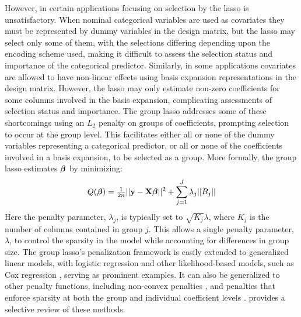 However, in certain applications focusing on selection by the lasso is unsatisfactory. When nominal categorical variables are used as covariates they must be represented by dummy variables in the design matrix, but the lasso may select only some of them, with the selections differing depending upon the encoding scheme used, making it difficult to assess the selection status and importance of the categorical predictor. Similarly, in some applications covariates are allowed to have non-linear effects using basis expansion representations in the design matrix. However, the lasso may only estimate non-zero coefficients for some columns involved in the basis expansion, complicating assessments of selection status and importance.
The group lasso \citep{Yuan2006} addresses some of these shortcomings using an $L_2$ penalty on groups of coefficients, prompting selection to occur at the group level. This facilitates either all or none of the dummy variables representing a categorical predictor, or all or none of the coefficients involved in a basis expansion, to be selected as a group. More formally, the group lasso estimates $\boldsymbol{\beta}$ by minimizing:
\begin{equation*}
Q(\boldsymbol{\beta}) = \tfrac{1}{2n}||\mathbf{y} - \mathbf{X}\boldsymbol{\beta}||^2 + \sum_{j = 1}^{J}\lambda_j ||B_j||
\end{equation*}
Here the penalty parameter, $\lambda_j$, is typically set to $\sqrt{K_j}\lambda$, where $K_j$ is the number of columns contained in group $j$. This allows a single penalty parameter, $\lambda$, to control the sparsity in the model while accounting for differences in group size. 
The group lasso’s penalization framework is easily extended to generalized linear models, with logistic regression \citep{meier2008} and other likelihood-based models, such as Cox regression \citep{Wang2009}, serving as prominent examples. It can also be generalized to other penalty functions, including non-convex penalties \citep{Breheny2012}, and penalties that enforce sparsity at both the group and individual coefficient levels \citep{Simon2013b}. \citet{Huang2012} provides a selective review of these methods.

